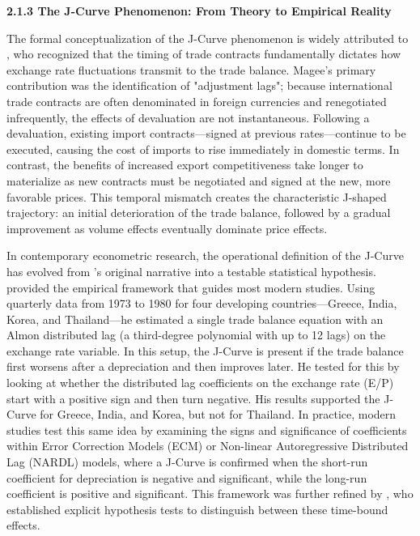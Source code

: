 \documentclass[12pt]{article}
\begin{document}
\vspace{0.5cm}
\noindent\textbf{2.1.3 The J-Curve Phenomenon: From Theory to Empirical Reality}

The formal conceptualization of the J-Curve phenomenon is widely attributed to \textcite{Magee1973-dr}, who recognized that the timing of trade contracts fundamentally dictates how exchange rate fluctuations transmit to the trade balance. Magee's primary contribution was the identification of "adjustment lags"; because international trade contracts are often denominated in foreign currencies and renegotiated infrequently, the effects of devaluation are not instantaneous. Following a devaluation, existing import contracts—signed at previous rates—continue to be executed, causing the cost of imports to rise immediately in domestic terms. In contrast, the benefits of increased export competitiveness take longer to materialize as new contracts must be negotiated and signed at the new, more favorable prices. This temporal mismatch creates the characteristic J-shaped trajectory: an initial deterioration of the trade balance, followed by a gradual improvement as volume effects eventually dominate price effects.

In contemporary econometric research, the operational definition of the J-Curve has evolved from \textcite{Magee1973-dr}'s original narrative into a testable statistical hypothesis. \textcite{Bahmani-Oskooee1985-jx} provided the empirical framework that guides most modern studies. Using quarterly data from 1973 to 1980 for four developing countries—Greece, India, Korea, and Thailand—he estimated a single trade balance equation with an Almon distributed lag (a third-degree polynomial with up to 12 lags) on the exchange rate variable. In this setup, the J-Curve is present if the trade balance first worsens after a depreciation and then improves later. He tested for this by looking at whether the distributed lag coefficients on the exchange rate (E/P) start with a positive sign and then turn negative. His results supported the J-Curve for Greece, India, and Korea, but not for Thailand. In practice, modern studies test this same idea by examining the signs and significance of coefficients within Error Correction Models (ECM) or Non-linear Autoregressive Distributed Lag (NARDL) models, where a J-Curve is confirmed when the short-run coefficient for depreciation is negative and significant, while the long-run coefficient is positive and significant. This framework was further refined by \textcite{Rose1989-bs}, who established explicit hypothesis tests to distinguish between these time-bound effects.
\end{document}
